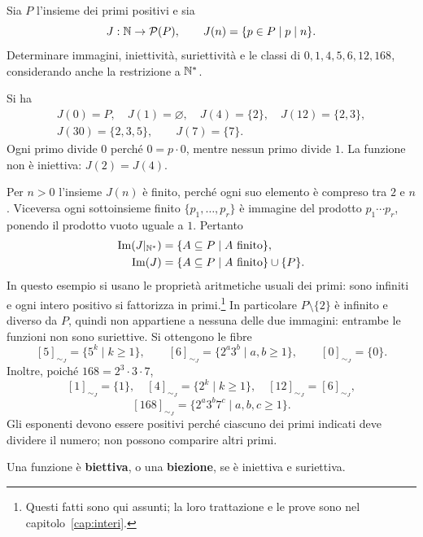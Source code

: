 \begin{esercizio}
Sia $P$ l'insieme dei primi positivi e sia
\[
J:\mathbb{N}\to\mathcal P(P),\qquad J(n)=\{p\in P\mid p\mid n\}.
\]
Determinare immagini, iniettività, suriettività e le classi di $0,1,4,5,6,12,168$, considerando anche la restrizione a $\mathbb{N}^*$.
\end{esercizio}
\begin{svolgimento}
Si ha
\[
\begin{gathered}
J(0)=P,\quad J(1)=\varnothing,\quad J(4)=\{2\},\quad J(12)=\{2,3\},\\
J(30)=\{2,3,5\},\qquad J(7)=\{7\}.
\end{gathered}
\]
Ogni primo divide $0$ perché $0=p\cdot0$, mentre nessun primo divide $1$. La funzione non è iniettiva: $J(2)=J(4)$.

Per $n>0$ l'insieme $J(n)$ è finito, perché ogni suo elemento è compreso tra $2$ e $n$. Viceversa ogni sottoinsieme finito $\{p_1,\ldots,p_r\}$ è immagine del prodotto $p_1\cdots p_r$, ponendo il prodotto vuoto uguale a $1$. Pertanto
\[
\begin{aligned}
\operatorname{Im}(J|_{\mathbb{N}^*})&=\{A\subseteq P\mid A\text{ finito}\},\\
\operatorname{Im}(J)&=\{A\subseteq P\mid A\text{ finito}\}\cup\{P\}.
\end{aligned}
\]
In questo esempio si usano le proprietà aritmetiche usuali dei primi: sono infiniti e ogni intero positivo si fattorizza in primi.\footnote{Questi fatti sono qui assunti; la loro trattazione e le prove sono nel capitolo~\ref{cap:interi}.} In particolare $P\setminus\{2\}$ è infinito e diverso da $P$, quindi non appartiene a nessuna delle due immagini: entrambe le funzioni non sono suriettive. Si ottengono le fibre
\[
[5]_{\sim_J}=\{5^k\mid k\ge1\},\qquad
[6]_{\sim_J}=\{2^a3^b\mid a,b\ge1\},\qquad [0]_{\sim_J}=\{0\}.
\]
Inoltre, poiché $168=2^3\cdot3\cdot7$,
\[
[1]_{\sim_J}=\{1\},\quad [4]_{\sim_J}=\{2^k\mid k\ge1\},\quad
[12]_{\sim_J}=[6]_{\sim_J},
\]
\[
[168]_{\sim_J}=\{2^a3^b7^c\mid a,b,c\ge1\}.
\]
Gli esponenti devono essere positivi perché ciascuno dei primi indicati deve dividere il numero; non possono comparire altri primi.
\end{svolgimento}

\begin{definizione}
Una funzione è \textbf{biettiva}, o una \textbf{biezione}, se è iniettiva e suriettiva.
\end{definizione}

